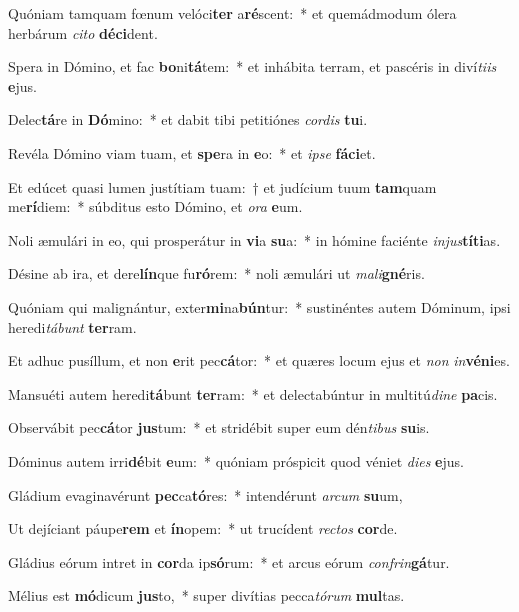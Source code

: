 \item Quóniam tamquam fœnum velóci\textbf{ter} a\textbf{ré}scent:~* et quemádmodum ólera herbárum \textit{ci}\textit{to} \textbf{dé}\textbf{ci}dent.
\item Spera in Dómino, et fac \textbf{bo}ni\textbf{tá}tem:~* et inhábita terram, et pascéris in diví\textit{ti}\textit{is} \textbf{e}jus.
\item Delec\textbf{tá}re in \textbf{Dó}mino:~* et dabit tibi petitiónes \textit{cor}\textit{dis} \textbf{tu}i.
\item Revéla Dómino viam tuam, et \textbf{spe}ra in \textbf{e}o:~* et \textit{ip}\textit{se} \textbf{fá}\textbf{ci}et.
\item Et edúcet quasi lumen justítiam tuam:~† et judícium tuum \textbf{tam}quam me\textbf{rí}diem:~* súbditus esto Dómino, et \textit{o}\textit{ra} \textbf{e}um.
\item Noli æmulári in eo, qui prosperátur in \textbf{vi}a \textbf{su}a:~* in hómine faciénte \textit{in}\textit{jus}\textbf{tí}\textbf{ti}as.
\item Désine ab ira, et dere\textbf{lín}que fu\textbf{ró}rem:~* noli æmulári ut \textit{ma}\textit{li}\textbf{gné}ris.
\item Quóniam qui malignántur, exter\textbf{mi}na\textbf{bún}tur:~* sustinéntes autem Dóminum, ipsi heredi\textit{tá}\textit{bunt} \textbf{ter}ram.
\item Et adhuc pusíllum, et non \textbf{e}rit pec\textbf{cá}tor:~* et quæres locum ejus et \textit{non} \textit{in}\textbf{vé}\textbf{ni}es.
\item Mansuéti autem heredi\textbf{tá}bunt \textbf{ter}ram:~* et delectabúntur in multitú\textit{di}\textit{ne} \textbf{pa}cis.
\item Observábit pec\textbf{cá}tor \textbf{jus}tum:~* et stridébit super eum dén\textit{ti}\textit{bus} \textbf{su}is.
\item Dóminus autem irri\textbf{dé}bit \textbf{e}um:~* quóniam próspicit quod véniet \textit{di}\textit{es} \textbf{e}jus.
\item Gládium evaginavérunt \textbf{pec}ca\textbf{tó}res:~* intendérunt \textit{ar}\textit{cum} \textbf{su}um,
\item Ut dejíciant páupe\textbf{rem} et \textbf{ín}opem:~* ut trucídent \textit{rec}\textit{tos} \textbf{cor}de.
\item Gládius eórum intret in \textbf{cor}da ip\textbf{só}rum:~* et arcus eórum \textit{con}\textit{frin}\textbf{gá}tur.
\item Mélius est \textbf{mó}dicum \textbf{jus}to,~* super divítias pecca\textit{tó}\textit{rum} \textbf{mul}tas.
